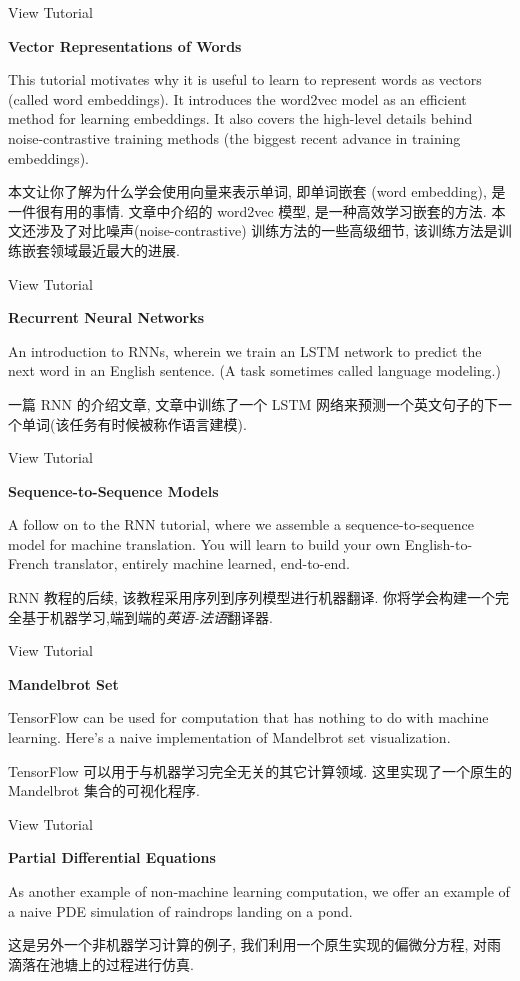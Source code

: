 View Tutorial

\textbf{Vector Representations of Words}

This tutorial motivates why it is useful to learn to represent words as vectors (called word embeddings). It introduces the word2vec model as an efficient method for learning embeddings. It also covers the high-level details behind noise-contrastive training methods (the biggest recent advance in training embeddings).

本文让你了解为什么学会使用向量来表示单词, 即单词嵌套 (word embedding), 是一件很有用的事情. 文章中介绍的 word2vec 模型, 是一种高效学习嵌套的方法. 本文还涉及了对比噪声(noise-contrastive) 训练方法的一些高级细节, 该训练方法是训练嵌套领域最近最大的进展.

View Tutorial

\textbf{Recurrent Neural Networks}

An introduction to RNNs, wherein we train an LSTM network to predict the next word in an English sentence. (A task sometimes called language modeling.)

一篇 RNN 的介绍文章, 文章中训练了一个 LSTM 网络来预测一个英文句子的下一个单词(该任务有时候被称作语言建模).

View Tutorial

\textbf{Sequence-to-Sequence Models}

A follow on to the RNN tutorial, where we assemble a sequence-to-sequence model for machine translation. You will learn to build your own English-to-French translator, entirely machine learned, end-to-end.

RNN 教程的后续, 该教程采用序列到序列模型进行机器翻译. 你将学会构建一个完全基于机器学习,端到端的\emph{英语-法语}翻译器.

View Tutorial

\textbf{Mandelbrot Set}

TensorFlow can be used for computation that has nothing to do with machine learning. Here's a naive implementation of Mandelbrot set visualization.

TensorFlow 可以用于与机器学习完全无关的其它计算领域. 这里实现了一个原生的 Mandelbrot 集合的可视化程序.

View Tutorial

\textbf{Partial Differential Equations}

As another example of non-machine learning computation, we offer an example of a naive PDE simulation of raindrops landing on a pond.

这是另外一个非机器学习计算的例子, 我们利用一个原生实现的偏微分方程, 对雨滴落在池塘上的过程进行仿真.


